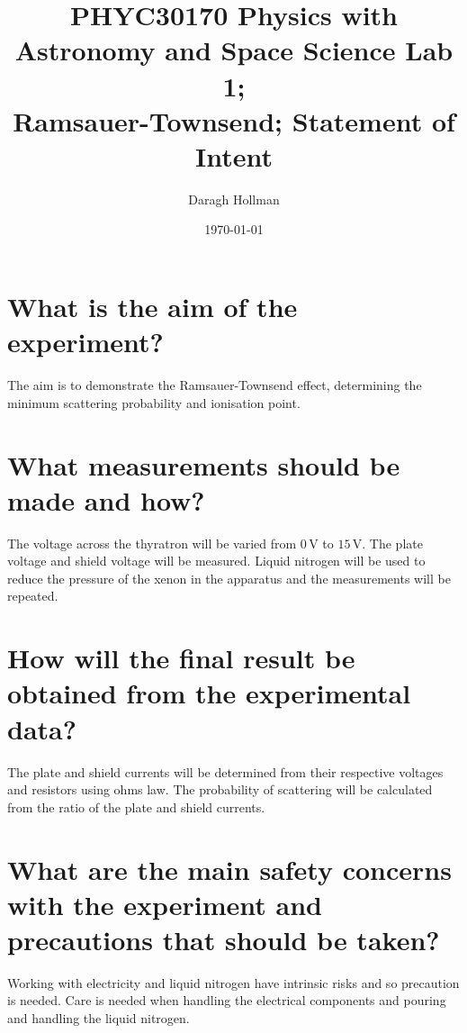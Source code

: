 \documentclass[%
reprint,
amsmath,amssymb,
aps,
]{revtex4-2}
\begin{document}
	\title{PHYC30170 Physics with Astronomy and Space Science Lab 1;\\
	Ramsauer-Townsend; Statement of Intent}
	
	\author{Daragh Hollman}
	
	\date{\today}
	
	\maketitle
	
	\onecolumngrid
	\section{What is the aim of the experiment?}
		The aim is to demonstrate the Ramsauer-Townsend effect, determining the minimum scattering probability and ionisation point.
	
	\section{What measurements should be made and how?}
		The voltage across the thyratron will be varied from $0\,\text{V}$ to $15\,\text{V}$. The plate voltage and shield voltage will be measured. Liquid nitrogen will be used to reduce the pressure of the xenon in the apparatus and the measurements will be repeated.
	
	\section{How will the final result be obtained from the experimental data?}
		The plate and shield currents will be determined from their respective voltages and resistors using ohms law. The probability of scattering will be calculated from the ratio of the plate and shield currents.
	
	\section{What are the main safety concerns with the experiment and precautions that should be taken?}
		Working with electricity and liquid nitrogen have intrinsic risks and so precaution is needed. Care is needed when handling the electrical components and pouring and handling the liquid nitrogen.
	
\end{document}
